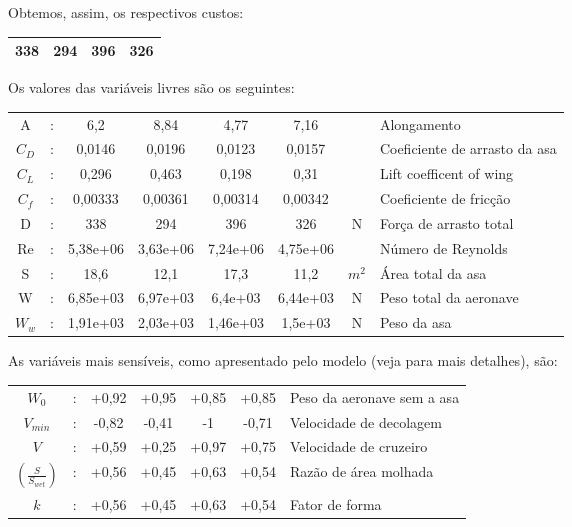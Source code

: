 \documentclass{article}
\begin{document}
Obtemos, assim, os respectivos custos:

\begin{tabular}{|c c c c|}
  \hline
  338 & 294 & 396 & 326\\
  \hline
\end{tabular}

Os valores das variáveis livres são os seguintes:

\begin{tabular}{|c c c c c c c l|}
  \hline
  A & : & 6,2 & 8,84 & 4,77 & 7,16 & & Alongamento \\ $C_D$ & : &
  0,0146 & 0,0196 & 0,0123 & 0,0157 & & Coeficiente de arrasto da asa
  \\ $C_L$ & : & 0,296 & 0,463 & 0,198 & 0,31 & & Lift coefficent of
  wing \\ $C_f$ & : & 0,00333 & 0,00361 & 0,00314 & 0,00342 & &
  Coeficiente de fricção \\ D & : & 338 & 294 & 396 & 326 & N & Força
  de arrasto total \\ Re & : & 5,38e+06 & 3,63e+06 & 7,24e+06 &
  4,75e+06 & & Número de Reynolds \\ S & : & 18,6 & 12,1 & 17,3 & 11,2
  & $m^2$ & Área total da asa \\ W & : & 6,85e+03 & 6,97e+03 & 6,4e+03
  & 6,44e+03 & N & Peso total da aeronave \\ $W_w$ & : & 1,91e+03 &
                                                                    2,03e+03 & 1,46e+03 & 1,5e+03 & N & Peso da asa \\
  \hline
\end{tabular}

As variáveis mais sensíveis, como apresentado pelo modelo (veja
\cite{gpkit} para mais detalhes), são:

\begin{tabular}{|c c c c c c l|}
  \hline
  $ W_0$ &: & +0,92 & +0,95 & +0,85 & +0,85 & Peso da aeronave sem a asa
  \\ $ V_{min}$ &: & -0,82 & -0,41 & -1 & -0,71 & Velocidade de
  decolagem \\ $ V$ &: & +0,59 & +0,25 & +0,97 & +0,75 & Velocidade de
  cruzeiro \\ $(\frac{S}{S_{wet}})$ &: & +0,56 & +0,45 & +0,63 & +0,54
  & Razão de área molhada \\ $ k$ &: & +0,56 & +0,45 & +0,63 & +0,54 &
                                                                       Fator de forma \\
  \hline
\end{tabular}
\end{document}
